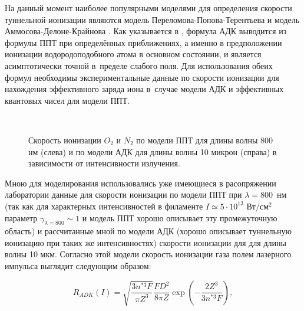 На данный момент наиболее популярными моделями для определения скорости туннельной ионизации являются
модель Переломова-Попова-Терентьева \cite{PPT1966} и модель Аммосова-Делоне-Крайнова \cite{ADK1986}.
Как указывается в \cite{Popov2004}, формула АДК выводится из формулы ППТ при определённых приближениях, а именно в предположении ионизации
водородоподобного атома в основном состоянии, и является асимптотически точной в~пределе слабого поля. Для использования обеих формул
необходимы экспериментальные данные по скорости ионизации для нахождения эффективного заряда иона в~случае модели АДК
и эффективных квантовых чисел для модели ППТ.


\begin{figure}[H]
    \begin{center}
        \begin{minipage}{\minipagewidthtwo}
        \end{minipage}
        \hfill        
        \begin{minipage}{\minipagewidthtwo}
        \end{minipage}
        \\[1ex]
        \caption{Скорость ионизации $O_2$ и $N_2$ по модели ППТ для длины волны 800 нм (слева) и по модели АДК для длины волны 10 микрон (справа) в зависимости от интенсивности излучения.}
        \label{fig:ModelIonizationRates}
    \end{center}
\end{figure}


Мною для моделирования использовались уже имеющиеся в расопряжении лаборатории данные для скорости ионизации по модели ППТ при $\lambda = 800$~нм
(так как для характерных интенсивностей в филаменте $I \simeq 5 \cdot 10^{13} \textrm{ Вт}/\textrm{см}^2$ параметр $\gamma_{\lambda=800} \sim 1$
и модель ППТ хорошо описывает эту промежуточную область)
и рассчитанные мной по модели АДК (хорошо описывает туннельную ионизацию при таких же интенсивностях) скорости ионизации для для длины волны 10 мкм.
Согласно этой модели скорость ионизации газа полем лазерного импульса выглядит следующим образом:

\begin{equation}\label{ModelADK}
R_{ADK}(I) = \sqrt{\dfrac{3 n^{*3} F}{\pi Z^3}}\dfrac{F D^2}{8 \pi Z} \exp \left( -\dfrac{2 Z^3}{3 n^{*3} F}\right),
\end{equation}

